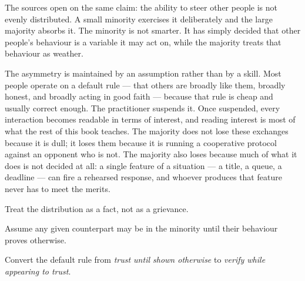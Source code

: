 


\begin{core}
The sources open on the same claim: the ability to steer other people is not evenly distributed. A small minority exercises it deliberately and the large majority absorbs it. The minority is not smarter. It has simply decided that other people's behaviour is a variable it may act on, while the majority treats that behaviour as weather.
\end{core}

\begin{mechanism}
The asymmetry is maintained by an assumption rather than by a skill. Most people operate on a default rule --- that others are broadly like them, broadly honest, and broadly acting in good faith --- because that rule is cheap and usually correct enough. The practitioner suspends it. Once suspended, every interaction becomes readable in terms of interest, and reading interest is most of what the rest of this book teaches. The majority does not lose these exchanges because it is dull; it loses them because it is running a cooperative protocol against an opponent who is not. The majority also loses because much of what it does is not decided at all: a single feature of a situation --- a title, a queue, a deadline --- can fire a rehearsed response, and whoever produces that feature never has to meet the merits.
\end{mechanism}

\begin{application}
  \item Treat the distribution as a fact, not as a grievance.
  \item Assume any given counterpart may be in the minority until their behaviour proves otherwise.
  \item Convert the default rule from \emph{trust until shown otherwise} to \emph{verify while appearing to trust}.
\end{application}

